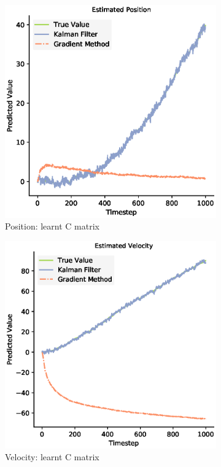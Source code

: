 \begin{figure}
  \begin{subfigure}{0.33\textwidth}
    \centering
    \includegraphics[width=.8\linewidth]{chapter_3_figures/Estimated_Position_C_matrix.eps}
    \caption{Position: learnt C matrix}
  \end{subfigure}%
  \begin{subfigure}{0.33\textwidth}
    \centering
    \includegraphics[width=.8\linewidth]{chapter_3_figures/Estimated_Velocity_C_matrix.eps}
    \caption{Velocity: learnt C matrix}
  \end{subfigure}
  \begin{subfigure}{0.33\textwidth}\quad

\end{subfigure}
\end{figure}
